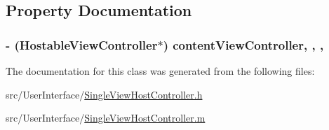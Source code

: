 \subsection{Property Documentation}
\hypertarget{interface_single_view_host_controller_a1ec163d3953f695d7ac4f2ee768c6a9a}{
\subsubsection[{content\-View\-Controller}]{\setlength{\rightskip}{0pt plus 5cm}-\/ ({\bf Hostable\-View\-Controller}$\ast$) content\-View\-Controller\hspace{0.3cm}{\ttfamily [read]}, {\ttfamily [write]}, {\ttfamily [atomic]}, {\ttfamily [retain]}}}\label{interface_single_view_host_controller_a1ec163d3953f695d7ac4f2ee768c6a9a}


The documentation for this class was generated from the following files\-:\begin{DoxyCompactItemize}
\item 
src/\-User\-Interface/\hyperlink{_single_view_host_controller_8h}{Single\-View\-Host\-Controller.\-h}\item 
src/\-User\-Interface/\hyperlink{_single_view_host_controller_8m}{Single\-View\-Host\-Controller.\-m}\end{DoxyCompactItemize}
